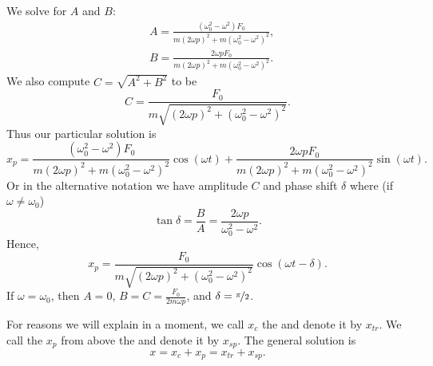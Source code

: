 \documentclass{ximera}
\begin{document}
We solve for $A$ and $B$:
\begin{align*}
    & A=\frac{(\omega_0^2-\omega^2) F_0} {m{(2\omega p)}^2+m{(\omega_0^2-\omega^2)}^2} , \\
    & B=\frac{2 \omega p F_0} {m{(2\omega p)}^2+m{(\omega_0^2-\omega^2)}^2} .
\end{align*}
We also compute $C = \sqrt{A^2+B^2}$ to be
\begin{equation*}
    C = \frac{F_0}{m \sqrt{{(2\omega p)}^2+{(\omega_0^2-\omega^2)}^2}} .
\end{equation*}
Thus our particular solution is
\begin{equation*}
    x_p = \frac{(\omega_0^2-\omega^2) F_0} {m{(2\omega p)}^2+m{(\omega_0^2-\omega^2)}^2} \cos (\omega t) + \frac{2 \omega p F_0} {m{(2\omega p)}^2+m{(\omega_0^2-\omega^2)}^2} \sin (\omega t) .
\end{equation*}
Or in the alternative notation we have amplitude $C$ and phase shift $\delta$ where (if $\omega \not= \omega_0$)
\begin{equation*}
    \tan \delta = \frac{B}{A} = \frac{2\omega p}{\omega_0^2-\omega^2} .
\end{equation*}
Hence,
\begin{equation*}
    x_p = 
    \frac{F_0}{m \sqrt{{(2\omega p)}^2+{(\omega_0^2-\omega^2)}^2}} 
    \cos ( \omega t - \delta ) .
\end{equation*}
If $\omega = \omega_0$, then $A=0$, $B = C = \frac{F_0}{2m\omega p}$, and $\delta = \nicefrac{\pi}{2}$.






For reasons we will explain in a moment, we call $x_c$ the \emph{} and denote it by $x_{tr}$.  We call the $x_p$ from above the \emph{} and denote it by $x_{sp}$. The general solution is
\begin{equation*}
    x = x_c + x_p = x_{tr} + x_{sp} .
\end{equation*}
\end{document}

